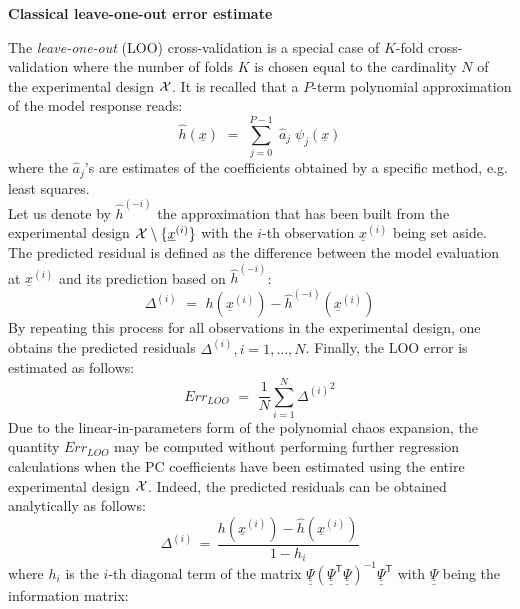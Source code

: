 {  
  \textbf{Classical leave-one-out error estimate} \vspace{2mm}

  The \emph{leave-one-out} (LOO) cross-validation is a special case of $K$-fold cross-validation where the number of folds $K$ is chosen equal to the cardinality $N$ of the experimental design ${\mathcal X}$. It is recalled that a $P$-term polynomial approximation of the model response reads:
  \begin{equation}
    \widehat{h}(\underline{x}) \, \, = \, \,  \sum_{j=0}^{P-1} \; \widehat{a}_{j} \; \psi_{j}(\underline{x})
  \end{equation}
  where the $\widehat{a}_{j}$'s are estimates of the coefficients obtained by a specific method, e.g. least squares. \\
  Let us denote by $\widehat{h}^{(-i)}$ the approximation that has been built from the experimental design ${\mathcal X} \setminus \{\underline{x}^{(i)}\}$ with the $i$-th observation $\underline{x}^{(i)}$ being set aside. The predicted residual is defined as the difference between the model evaluation at $\underline{x}^{(i)}$ and its prediction based on $\widehat{h}^{(-i)}$:
  \begin{equation} \label{eq:4.3:5}
    \Delta^{(i)} \, \, = \, \,  h(\underline{x}^{(i)}) - \widehat{h}^{(-i)}(\underline{x}^{(i)})
  \end{equation}
  By repeating this process for all observations in the experimental design, one obtains the predicted residuals $\Delta^{(i)}, i = 1, \dots , N$. Finally, the LOO error is estimated as follows:
  \begin{equation}\label{eq:4.3:6}
    Err_{LOO} \, \, = \, \, \frac{1}{N} \sum_{i=1}^{N} {\Delta^{(i)}}^{2}
  \end{equation}
  Due to the linear-in-parameters form of the polynomial chaos expansion, the quantity $Err_{LOO}$ may be computed without performing further regression calculations when the PC coefficients have been estimated using the entire experimental design ${\mathcal X}$. Indeed, the predicted residuals can be obtained analytically as follows:
  \begin{equation} \label{eq:4.3:7}
    \Delta^{(i)} \, = \,
    \frac{h(\underline{x}^{(i)}) - \widehat{h}(\underline{x}^{(i)})}{1 - h_i}
  \end{equation}
  where $h_i$ is the $i$-th diagonal term of the matrix $\underline{\underline{\Psi}} (\underline{\underline{\Psi}}^{\textsf{T}}\underline{\underline{\Psi}})^{-1} \underline{\underline{\Psi}}^{\textsf{T}}$ with $\underline{\underline{\Psi}}$ being the information matrix:
}
